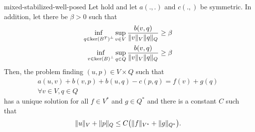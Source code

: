 \begin{Theorem}{mixed-stabilized-well-posed}
  Let  hold and
  let $a(.,.)$ and $c(.,)$ be symmetric. In addition, let there be
  $\beta>0$ such that
  \begin{gather}
    \begin{split}
      \inf_{q\in \operatorname{ker}\left(B^T\right)^\perp}  \sup_{v\in V}
      \frac{b(v,q)}{\lVert v\rVert_V\lVert q\rVert_Q} &\ge \beta\\
      \inf_{v\in \operatorname{ker}\left(B\right)^\perp}  \sup_{q\in Q}
      \frac{b(v,q)}{\lVert v\rVert_V\lVert q\rVert_Q} &\ge \beta
    \end{split}
  \end{gather}
  Then, the problem finding $(u,p)\in V\times Q$ such that
  \begin{multline}
    a(u,v) + b(v,p) + b(u,q) - c(p,q) = f(v)+g(q)
    \\
    \forall v\in V, q\in Q
  \end{multline}
  has a unique solution for all $f\in V^*$ and $g\in Q^*$ and there is
  a constant $C$ such that
  \begin{gather}
    \lVert u\rVert_V+\lVert p\rVert_Q
    \le C \bigl(\lVert f\rVert_{V^*} + \lVert g\rVert_{Q^*}\bigr).
  \end{gather}
\end{Theorem}

